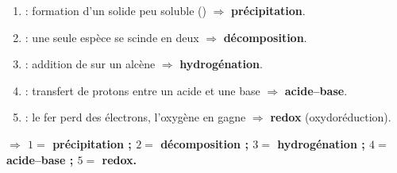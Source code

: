 \documentclass[11pt,a4paper]{article}
\newcommand{\rep}[1]{\par\smallskip\noindent\textbf{\color{corrcol}$\Rightarrow$ #1}}
\begin{document}
\begin{cor}
\begin{enumerate}[label=\arabic*., leftmargin=1.8em,topsep=1pt,itemsep=1pt]
  \item {} : formation d'un solide peu soluble ()
        $\Rightarrow$ \textbf{précipitation}.
  \item {} : une seule espèce se scinde en deux $\Rightarrow$ \textbf{décomposition}.
  \item {} : addition de  sur un alcène $\Rightarrow$ \textbf{hydrogénation}.
  \item {} : transfert de protons entre un acide et une base
        $\Rightarrow$ \textbf{acide--base}.
  \item {} : le fer perd des électrons, l'oxygène en gagne
        $\Rightarrow$ \textbf{redox} (oxydoréduction).
\end{enumerate}
\rep{$1=$ précipitation ; $2=$ décomposition ; $3=$ hydrogénation ; $4=$ acide--base ; $5=$ redox.}
\end{cor}
\end{document}
